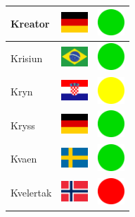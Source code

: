 \documentclass[12pt, a4paper, twoside]{report}
\begin{document}
\begin{center}
\begin{longtable}{|p{5cm}|p{2cm}|p{2cm}|}
 Kreator                                                    & \includegraphics[width=1cm]{../img/flags/de} &   \includegraphics[width=1cm]{../likes/y} \\ \hline
 Krisiun                                                    & \includegraphics[width=1cm]{../img/flags/br} &   \includegraphics[width=1cm]{../likes/y} \\ \hline
 Kryn                                                       & \includegraphics[width=1cm]{../img/flags/hr} &   \includegraphics[width=1cm]{../likes/m} \\ \hline
 Kryss                                                      & \includegraphics[width=1cm]{../img/flags/de} &   \includegraphics[width=1cm]{../likes/y} \\ \hline
 Kvaen                                                      & \includegraphics[width=1cm]{../img/flags/se} &   \includegraphics[width=1cm]{../likes/y} \\ \hline
 Kvelertak                                                  & \includegraphics[width=1cm]{../img/flags/no} &   \includegraphics[width=1cm]{../likes/n} \\ \hline

\end{longtable}
\end{center}
\end{document}
